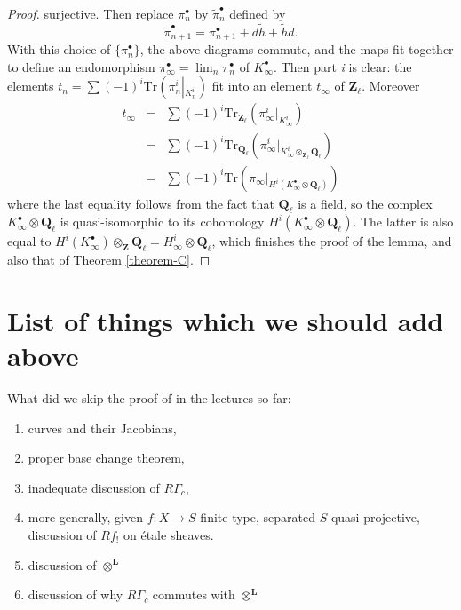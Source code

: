 \begin{proof}
surjective. Then replace $\pi_n^\bullet$ by $\tilde\pi_n^\bullet$ defined by
$$
\tilde\pi_{n+1}^\bullet = \pi_{n+1}^\bullet + d\tilde h+\tilde hd.
$$
With this choice of $\{\pi_n^\bullet\}$, the above diagrams commute, and the
maps fit together to define an endomorphism $\pi_\infty^\bullet =
\lim_n\pi_n^\bullet$ of $K_\infty^\bullet$. Then part {\it i} is clear:
the elements $t_n = \sum(-1)^i
\text{Tr}\left(\pi_n^i\left|_{K_n^i}\right.\right)$ fit into an element
$t_\infty$ of $\mathbf{Z}_\ell$. Moreover
\begin{eqnarray*}
t_\infty & = & \sum(-1)^i
\text{Tr}_{\mathbf{Z}_\ell}\left(\pi_\infty^i\big|_{K_\infty^i}\right) \\
& = & \sum(-1)^i
\text{Tr}_{\mathbf{Q}_\ell}\left(
\pi_\infty^i\big|_{K_\infty^i \otimes_{\mathbf{Z}_\ell}\mathbf{Q}_\ell}
\right) \\
& =
& \sum(-1)^i\text{Tr}\left(
\pi_\infty\big|_{H^i(K_\infty^\bullet \otimes \mathbf{Q}_\ell)}
\right)
\end{eqnarray*}
where the last equality follows from the fact that $\mathbf{Q}_\ell$ is a
field, so the complex $K_\infty^\bullet \otimes \mathbf{Q}_\ell$ is
quasi-isomorphic to its cohomology
$H^i(K_\infty^\bullet \otimes \mathbf{Q}_\ell)$. The latter is also equal to
$H^i(K_\infty^\bullet)\otimes_{\mathbf{Z}}\mathbf{Q}_\ell = H_\infty^i \otimes
\mathbf{Q}_\ell$, which finishes the proof of the lemma, and also that of
Theorem \ref{theorem-C}.
\end{proof}




\section{List of things which we should add above}
\label{section-list-skipped}

\noindent
What did we skip the proof of in the lectures so far:
\begin{enumerate}
\item curves and their Jacobians,
\item proper base change theorem,
\item inadequate discussion of $R\Gamma_c$,
\item more generally, given $f : X \to S$ finite type,
separated $S$ quasi-projective, discussion of $Rf_!$ on \'etale sheaves.
\item discussion of $\otimes^{\mathbf{L}}$
\item discussion of why $R\Gamma_c$ commutes with $\otimes^{\mathbf{L}}$
\end{enumerate}






